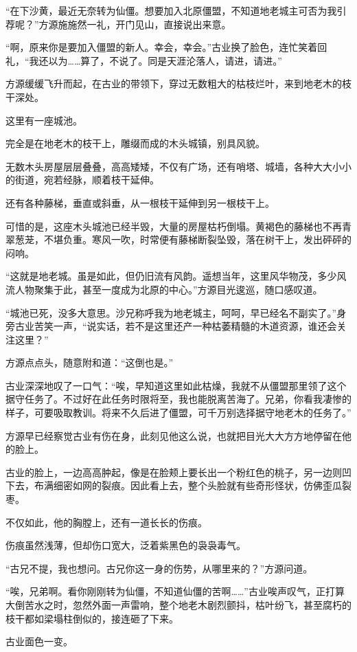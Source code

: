 \begin{this_body}
“在下沙黄，最近无奈转为仙僵。想要加入北原僵盟，不知道地老城主可否为我引荐呢？”方源施施然一礼，开门见山，直接说出来意。

“啊，原来你是要加入僵盟的新人。幸会，幸会。”古业换了脸色，连忙笑着回礼，“我还以为……算了，不说了。同是天涯沦落人，请进，请进。”

方源缓缓飞升而起，在古业的带领下，穿过无数粗大的枯枝烂叶，来到地老木的枝干深处。

这里有一座城池。

完全是在地老木的枝干上，雕缀而成的木头城镇，别具风貌。

无数木头房屋层层叠叠，高高矮矮，不仅有广场，还有哨塔、城墙，各种大大小小的街道，宛若经脉，顺着枝干延伸。

还有各种藤梯，垂直或斜垂，从一根枝干延伸到另一根枝干上。

可惜的是，这座木头城池已经半毁，大量的房屋枯朽倒塌。黄褐色的藤梯也不再青翠葱茏，不堪负重。寒风一吹，时常便有藤梯断裂坠毁，落在树干上，发出砰砰的闷响。

“这就是地老城。虽是如此，但仍旧流有风韵。遥想当年，这里风华物茂，多少风流人物聚集于此，甚至一度成为北原的中心。”方源目光逡巡，随口感叹道。

“城池已死，没多大意思。沙兄称呼我为地老城主，呵呵，早已经名不副实了。”身旁古业苦笑一声，“说实话，若不是这里还产一种枯萎精髓的木道资源，谁还会关注这里？”

方源点点头，随意附和道：“这倒也是。”

古业深深地叹了一口气：“唉，早知道这里如此枯燥，我就不从僵盟那里领了这个据守任务了。不过好在此任务时限将至，我也能脱离苦海了。兄弟，你看我凄惨的样子，可要吸取教训。将来不久后进了僵盟，可千万别选择据守地老木的任务了。”

方源早已经察觉古业有伤在身，此刻见他这么说，也就把目光大大方方地停留在他的脸上。

古业的脸上，一边高高肿起，像是在脸颊上要长出一个粉红色的桃子，另一边则凹下去，布满细密如网的裂痕。因此看上去，整个头脸就有些奇形怪状，仿佛歪瓜裂枣。

不仅如此，他的胸膛上，还有一道长长的伤痕。

伤痕虽然浅薄，但却伤口宽大，泛着紫黑色的袅袅毒气。

“古兄不提，我也想问。古兄你这一身的伤势，从哪里来的？”方源问道。

“唉，兄弟啊。看你刚刚转为仙僵，不知道仙僵的苦啊……”古业唉声叹气，正打算大倒苦水之时，忽然外面一声雷响，整个地老木剧烈颤抖，枯叶纷飞，甚至腐朽的枝干都如梁塌柱倒似的，接连砸了下来。

古业面色一变。


\end{this_body}
